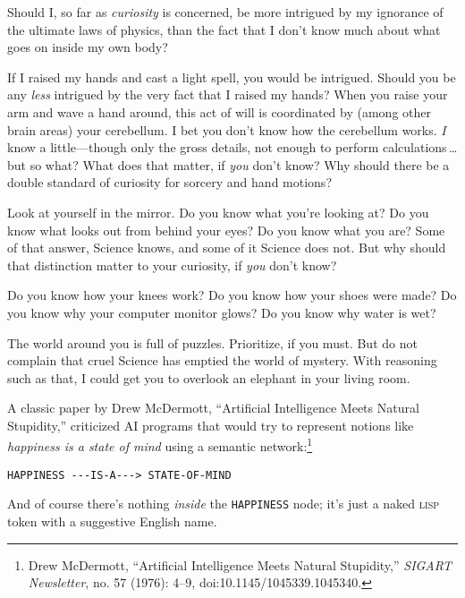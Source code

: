{
 Should I, so far as \textit{curiosity} is concerned, be more
intrigued by my ignorance of the ultimate laws of physics, than the
fact that I don't know much about what goes on inside
my own body?}

{
 If I raised my hands and cast a light spell, you would be
intrigued. Should you be any \textit{less} intrigued by the very fact
that I raised my hands? When you raise your arm and wave a hand around,
this act of will is coordinated by (among other brain areas) your
cerebellum. I bet you don't know how the cerebellum
works. \textit{I} know a little---though only the gross details, not
enough to perform calculations\,\ldots but so what? What does that
matter, if \textit{you} don't know? Why should there be
a double standard of curiosity for sorcery and hand motions?}

{
 Look at yourself in the mirror. Do you know what
you're looking at? Do you know what looks out from
behind your eyes? Do you know what you are? Some of that answer,
Science knows, and some of it Science does not. But why should that
distinction matter to your curiosity, if \textit{you}
don't know?}

{
 Do you know how your knees work? Do you know how your shoes were
made? Do you know why your computer monitor glows? Do you know why
water is wet?}

{
 The world around you is full of puzzles. Prioritize, if you must.
But do not complain that cruel Science has emptied the world of
mystery. With reasoning such as that, I could get you to overlook an
elephant in your living room.}

\myendsectiontext

\label{truly_part_of_you}

{
 A classic paper by Drew McDermott, ``Artificial
Intelligence Meets Natural Stupidity,'' criticized AI
programs that would try to represent notions like \textit{happiness is
a state of mind} using a semantic network:\footnote{Drew McDermott, ``Artificial Intelligence
Meets Natural Stupidity,'' \textit{SIGART
Newsletter}, no. 57 (1976): 4--9, doi:10.1145/1045339.1045340.}}

\begin{center}
 \texttt{HAPPINESS -{}-{}-IS-A-{}-{}-{\textgreater} STATE-OF-MIND}
\end{center}

{
 And of course there's nothing \textit{inside} the
\texttt{HAPPINESS} node; it's just a naked \textsc{lisp} token with a
suggestive English name.}

